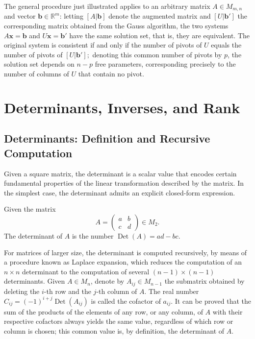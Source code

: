 The general procedure just illustrated applies to an arbitrary matrix $A \in M_{m,n}$ and vector $\mathbf{b} \in \mathbb{R}^m$: letting $[A|\mathbf{b}]$ denote the augmented matrix and $[U|\mathbf{b}']$ the corresponding matrix obtained from the Gauss algorithm, the two systems $A\mathbf{x} = \mathbf{b}$ and $U\mathbf{x} = \mathbf{b}'$ have the same solution set, that is, they are equivalent. The original system is consistent if and only if the number of pivots of $U$ equals the number of pivots of $[U|\mathbf{b}'];$ denoting this common number of pivots by $p$, the solution set depends on $n - p$ free parameters, corresponding precisely to the number of columns of $U$ that contain no pivot.

\section{Determinants, Inverses, and Rank}

\subsection{Determinants: Definition and Recursive Computation}

Given a square matrix, the determinant is a scalar value that encodes certain fundamental properties of the linear transformation described by the matrix. In the simplest case, the determinant admits an explicit closed-form expression.

\begin{definition}
Given the matrix
\[
A = \begin{pmatrix} a & b \\ c & d \end{pmatrix} \in M_2.
\]
The determinant of $A$ is the number $\operatorname{Det}(A) = ad - bc$.
\end{definition}

For matrices of larger size, the determinant is computed recursively, by means of a procedure known as Laplace expansion, which reduces the computation of an $n \times n$ determinant to the computation of several $(n-1) \times (n-1)$ determinants. Given $A \in M_n$, denote by $A_{ij} \in M_{n-1}$ the submatrix obtained by deleting the $i$-th row and the $j$-th column of $A$. The real number $C_{ij} = (-1)^{i+j} \operatorname{Det}(A_{ij})$ is called the cofactor of $a_{ij}$. It can be proved that the sum of the products of the elements of any row, or any column, of $A$ with their respective cofactors always yields the same value, regardless of which row or column is chosen; this common value is, by definition, the determinant of $A$.

